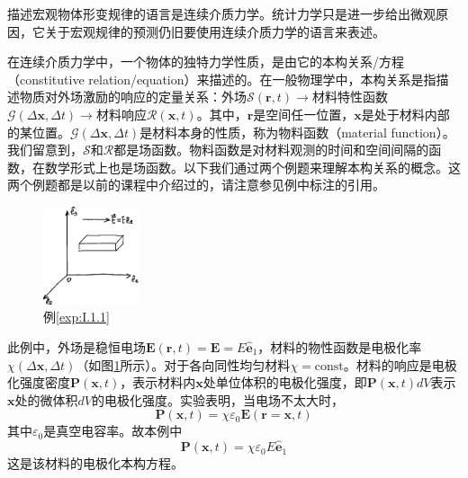 \documentclass[main.tex]{subfiles}
\begin{document}
描述宏观物体形变规律的语言是连续介质力学。统计力学只是进一步给出微观原因，它关于宏观规律的预测仍旧要使用连续介质力学的语言来表述。

在连续介质力学中，一个物体的独特力学性质，是由它的本构关系/方程（constitutive relation/equation）来描述的。在一般物理学中，本构关系是指描述物质对外场激励的响应的定量关系：外场$\mathcal{S}\left(\mathbf{r},t\right)\rightarrow$材料特性函数$\mathcal{G}\left(\Delta\mathbf{x},\Delta t\right)\rightarrow$材料响应$\mathcal{R}\left(\mathbf{x},t\right)$。其中，$\mathbf{r}$是空间任一位置，$\mathbf{x}$是处于材料内部的某位置。$\mathcal{G}\left(\Delta\mathbf{x},\Delta t\right)$是材料本身的性质，称为物料函数（material function）。我们留意到，$\mathcal{S}$和$\mathcal{R}$都是场函数。物料函数是对材料观测的时间和空间间隔的函数，在数学形式上也是场函数\cite[\S~9.7,p.192]{华工高数2009下}。以下我们通过两个例题来理解本构关系的概念。这两个例题都是以前的课程中介绍过的，请注意参见例中标注的引用。

\begin{figure}[h]
    \centering
    \includegraphics[width=0.25\textwidth]{images/I.1.2.eps}
    \caption{例\ref{exp:I.1.1}}
    \label{fig:I.1.2}
\end{figure}

\begin{example}\label{exp:I.1.1}
    此例中，外场是稳恒电场$\mathbf{E}\left(\mathbf{r},t\right)=\mathbf{E}=E\mathbf{\hat{e}}_1$，材料的物性函数是电极化率$\chi\left(\Delta\mathbf{x},\Delta t\right)$（如图\ref{fig:I.1.2}所示）。对于各向同性均匀材料$\chi=\text{const}$。材料的响应是电极化强度密度$\mathbf{P}\left(\mathbf{x},t\right)$，表示材料内$\mathbf{x}$处单位体积的电极化强度，即$\mathbf{P}\left(\mathbf{x},t\right)dV$表示$\mathbf{x}$处的微体积$dV$的电极化强度。实验表明，当电场不太大时\cite[\S18.2.3,p.~57]{邓文基2009大物下}，
    \[
        \mathbf{P}\left(\mathbf{x},t\right)=\chi\varepsilon_0\mathbf{E}\left(\mathbf{r}=\mathbf{x},t\right)
    \]
    其中$\varepsilon_0$是真空电容率。故本例中
    \[
        \mathbf{P}\left(\mathbf{x},t\right)=\chi\varepsilon_0 E\mathbf{\hat{e}}_1
    \]
    这是该材料的电极化本构方程。
\end{example}
\end{document}
